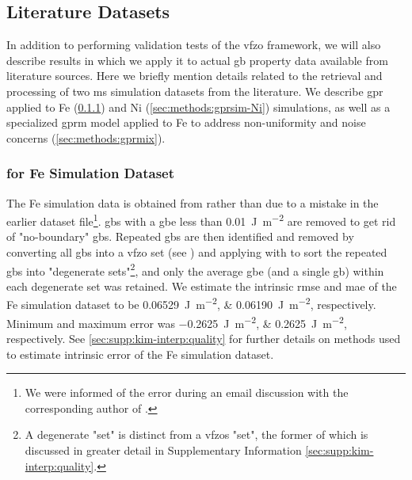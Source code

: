 \documentclass[final,twocolumn,12pt]{elsarticle}
\begin{document}

\subsection{Literature Datasets}
\label{sec:methods:litdata}
In addition to performing validation tests of the \gls{vfzo} framework, we will also describe results in which we apply it to actual \gls{gb} property data available from literature sources. Here we briefly mention details related to the retrieval and processing of two \gls{ms} simulation datasets from the literature. We describe \gls{gpr} applied to Fe (\cref{sec:methods:gprsim}) and Ni (\cref{sec:methods:gprsim-Ni}) simulations, as well as a specialized \gls{gprm} model applied to Fe to address non-uniformity and noise concerns (\cref{sec:methods:gprmix}).

\subsubsection{ for Fe Simulation Dataset}
\label{sec:methods:gprsim}
The Fe simulation data is obtained from \cite{kimPhasefieldModeling3D2014} rather than \cite{kimIdentificationSchemeGrain2011} due to a mistake in the earlier dataset file\footnote{We were informed of the error during an email discussion with the corresponding author of \cite{kimPhasefieldModeling3D2014}.}. \Glspl{gb} with a \gls{gbe} less than \SI{0.01}{\joule\per\square\meter} are removed to get rid of "no-boundary" \glspl{gb}. Repeated \glspl{gb} are then identified and removed by converting all \glspl{gb} into a \gls{vfzo} set (see ) and applying  with  to sort the repeated \glspl{gb} into "degenerate sets"\footnote{A degenerate "set" is distinct from a \glspl{vfzo} "set", the former of which is discussed in greater detail in Supplementary Information \cref{sec:supp:kim-interp:quality}. }, and only the average \gls{gbe} (and a single \gls{gb}) within each degenerate set was retained. We estimate the intrinsic \gls{rmse} and \gls{mae} of the Fe simulation dataset to be \SIlist{0.06529;0.06190}{\joule\per\square\meter}, respectively. Minimum and maximum error was \SIlist{-0.2625;0.2625}{\joule\per\square\meter}, respectively. See \cref{sec:supp:kim-interp:quality} for further details on methods used to estimate intrinsic error of the Fe simulation dataset.
\end{document}
